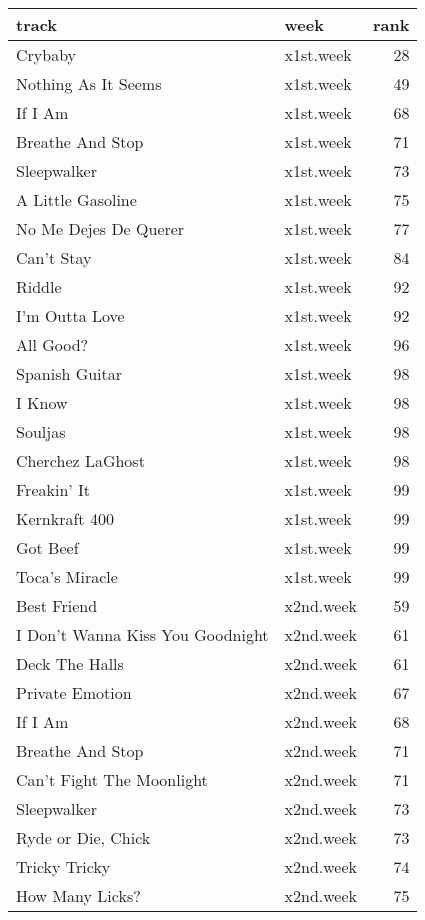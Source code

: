 \begin{table}[ht]
\centering
\begin{tabular}{llr}
  \hline
track & week & rank \\ 
  \hline
Crybaby & x1st.week &  28 \\ 
  Nothing As It Seems & x1st.week &  49 \\ 
  If I Am & x1st.week &  68 \\ 
  Breathe And Stop & x1st.week &  71 \\ 
  Sleepwalker & x1st.week &  73 \\ 
  A Little Gasoline & x1st.week &  75 \\ 
  No Me Dejes De Querer & x1st.week &  77 \\ 
  Can't Stay & x1st.week &  84 \\ 
  Riddle & x1st.week &  92 \\ 
  I'm Outta Love & x1st.week &  92 \\ 
  All Good? & x1st.week &  96 \\ 
  Spanish Guitar & x1st.week &  98 \\ 
  I Know & x1st.week &  98 \\ 
  Souljas & x1st.week &  98 \\ 
  Cherchez LaGhost & x1st.week &  98 \\ 
  Freakin' It & x1st.week &  99 \\ 
  Kernkraft 400 & x1st.week &  99 \\ 
  Got Beef & x1st.week &  99 \\ 
  Toca's Miracle & x1st.week &  99 \\ 
  Best Friend & x2nd.week &  59 \\ 
  I Don't Wanna Kiss You Goodnight & x2nd.week &  61 \\ 
  Deck The Halls & x2nd.week &  61 \\ 
  Private Emotion & x2nd.week &  67 \\ 
  If I Am & x2nd.week &  68 \\ 
  Breathe And Stop & x2nd.week &  71 \\ 
  Can't Fight The Moonlight & x2nd.week &  71 \\ 
  Sleepwalker & x2nd.week &  73 \\ 
  Ryde or Die, Chick & x2nd.week &  73 \\ 
  Tricky Tricky  & x2nd.week &  74 \\ 
  How Many Licks? & x2nd.week &  75 \\ 

\end{tabular}
\end{table}
